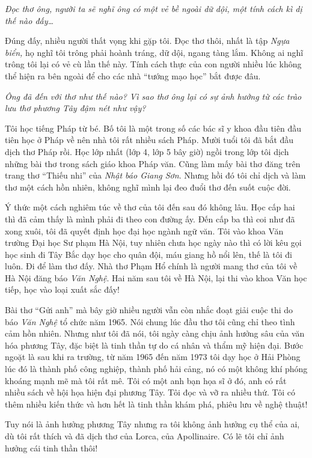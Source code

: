 \documentclass[../main.tex]{subfiles}
\begin{document}
\begin{multicols}{2}
\textit{Đọc thơ ông, người ta sẽ nghĩ ông có một vẻ bề ngoài dữ dội, một tính cách kì dị thế nào đấy…} 
 
Đúng đấy, nhiều người thất vọng khi gặp tôi. Đọc thơ thôi, nhất là tập \textit{Ngựa biển,} họ nghĩ tôi trông phải hoành tráng, dữ dội, ngang tàng lắm. Không ai nghĩ trông tôi lại có vẻ cù lần thế này. Tính cách thực của con người nhiều lúc không thể hiện ra bên ngoài để cho các nhà “tướng mạo học” bắt được đâu. 
 
\textit{Ông đã đến với thơ như thế nào? Vì sao thơ ông lại có sự ảnh hưởng từ các trào lưu thơ phương Tây đậm nét như vậy?} 
 
Tôi học tiếng Pháp từ bé. Bố tôi là một trong số các bác sĩ y khoa đầu tiên đầu tiên học ở Pháp về nên nhà tôi rất nhiều sách Pháp. Mười tuổi tôi đã bắt đầu dịch thơ Pháp rồi. Học lớp nhất (lớp 4, lớp 5 bây giờ) ngồi trong lớp tôi dịch những bài thơ trong sách giáo khoa Pháp văn. Cũng làm mấy bài thơ đăng trên trang thơ “Thiếu nhi” của \textit{Nhật báo Giang Sơn}. Nhưng hồi đó tôi chỉ dịch và làm thơ một cách hồn nhiên, không nghĩ mình lại đeo đuổi thơ đến suốt cuộc đời.  
 
Ý thức một cách nghiêm túc về thơ của tôi đến sau đó không lâu. Học cấp hai thì đã cảm thấy là mình phải đi theo con đường ấy. Đến cấp ba thì coi như đã xong xuôi, tôi đã quyết định học đại học ngành ngữ văn. Tôi vào khoa Văn trường Đại học Sư phạm Hà Nội, tuy nhiên chưa học ngày nào thì có lời kêu gọi học sinh đi Tây Bắc dạy học cho quân đội, máu giang hồ nổi lên, thế là tôi đi luôn. Đi để làm thơ đấy. Nhà thơ Phạm Hổ chính là người mang thơ của tôi về Hà Nội đăng báo \textit{Văn Nghệ}. Hai năm sau tôi về Hà Nội, lại thi vào khoa Văn học tiếp, học vào loại xuất sắc đấy! 
 
Bài thơ “Gửi anh” mà bây giờ nhiều người vẫn còn nhắc đoạt giải cuộc thi do báo \textit{Văn Nghệ} tổ chức năm 1965. Nói chung lúc đầu thơ tôi cũng chỉ theo tình cảm hồn nhiên. Nhưng như tôi đã nói, tôi ngày càng chịu ảnh hưởng sâu của văn hóa phương Tây, đặc biệt là tinh thần tự do cá nhân và thẩm mỹ hiện đại. Bước ngoặt là sau khi ra trường, từ năm 1965 đến năm 1973 tôi dạy học ở Hải Phòng lúc đó là thành phố công nghiệp, thành phố hải cảng, nó có một không khí phóng khoáng mạnh mẽ mà tôi rất mê. Tôi có một anh bạn họa sĩ ở đó, anh có rất nhiều sách về hội họa hiện đại phương Tây. Tôi đọc và vỡ ra nhiều thứ. Tôi có thêm nhiều kiến thức và hơn hết là tinh thần khám phá, phiêu lưu về nghệ thuật!  
 
Tuy nói là ảnh hưởng phương Tây nhưng ra tôi không ảnh hưởng cụ thể của ai, dù tôi rất thích và đã dịch thơ của Lorca, của Apollinaire. Có lẽ tôi chỉ ảnh hưởng cái tinh thần thôi! 
  

\end{multicols}
\end{document}
